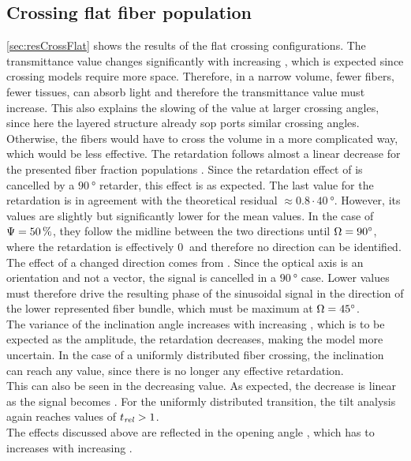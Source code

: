 \subsection{Crossing flat fiber population}
\cref{sec:resCrossFlat} shows the results of the flat crossing configurations.
The transmittance value changes significantly with increasing \modelOmega{}, which is expected since crossing models require more space.
Therefore, in a narrow volume, fewer fibers, \ie{} fewer tissues, can absorb light and therefore the transmittance value must increase.
This also explains the slowing of the value at larger crossing angles, since here the layered structure already sop ports similar crossing angles.
Otherwise, the fibers would have to cross the volume in a more complicated way, which would be less effective.
% 
The retardation follows almost a linear decrease for the presented fiber fraction populations \modelPsi{}.
Since the retardation effect of is cancelled by a $\SI{90}{\degree}$ retarder, this effect is as expected.
The last value for the retardation is in agreement with the theoretical residual $\approx 0.8\cdot \SI{40}{\degree}$.
However, its values are slightly but significantly lower for the mean \trel{} values.
In the case of $\textnormal{$\Psi$}{} = \SI{50}{\percent}$, they follow the midline between the two directions until $\textnormal{$\Omega$}=\SI{90}{\degree}$, where the retardation is effectively $\SI{0}{}$ and therefore no direction can be identified.
\\
% 
The effect of a changed direction comes from \dummy{}. 
Since the optical axis is an orientation and not a vector, the signal is cancelled in a $\SI{90}{\degree}$ case.
Lower values must therefore drive the resulting phase of the sinusoidal signal in the direction of the lower represented fiber bundle, which must be maximum at $\textnormal{$\Omega$}=\SI{45}{\degree}$. 
\\
% 
The variance of the inclination angle increases with increasing \modelOmega{}, which is to be expected as the amplitude, \ie{} the retardation decreases, making the model more uncertain.
In the case of a uniformly distributed fiber crossing, the inclination can reach any value, since there is no longer any effective retardation.
\\
%
This can also be seen in the decreasing \trel{} value.
As expected, the decrease is linear as the signal becomes \dummy{}.
For the uniformly distributed transition, the tilt analysis again reaches values of $\textnormal{$t_\mathit{rel}$}>1$.
\\
% 
The effects discussed above are reflected in the opening angle \modelDOmega{}, which has to increases with increasing \modelOmega{}.
% 
% 
% 
